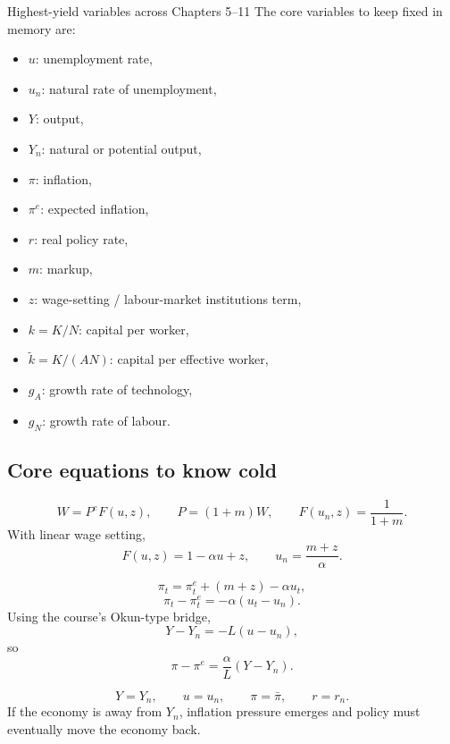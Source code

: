 \documentclass[12pt]{article}
\begin{document}
\begin{definition}{Highest-yield variables across Chapters 5--11}{}
The core variables to keep fixed in memory are:
\begin{itemize}[leftmargin=1.5em]
    \item $u$: unemployment rate,
    \item $u_n$: natural rate of unemployment,
    \item $Y$: output,
    \item $Y_n$: natural or potential output,
    \item $\pi$: inflation,
    \item $\pi^e$: expected inflation,
    \item $r$: real policy rate,
    \item $m$: markup,
    \item $z$: wage-setting / labour-market institutions term,
    \item $k=K/N$: capital per worker,
    \item $\tilde{k}=K/(AN)$: capital per effective worker,
    \item $g_A$: growth rate of technology,
    \item $g_N$: growth rate of labour.
\end{itemize}
\end{definition}

\subsection{Core equations to know cold}

\begin{keyformula}[title={Key Formula: Labour market and natural rate}]
\[
W=P^eF(u,z),
\qquad
P=(1+m)W,
\qquad
F(u_n,z)=\frac{1}{1+m}.
\]
With linear wage setting,
\[
F(u,z)=1-\alpha u+z,
\qquad
u_n=\frac{m+z}{\alpha}.
\]
\end{keyformula}

\begin{keyformula}[title={Key Formula: Phillips curve forms}]
\[
\pi_t=\pi_t^e+(m+z)-\alpha u_t,
\]
\[
\pi_t-\pi_t^e=-\alpha(u_t-u_n).
\]
Using the course's Okun-type bridge,
\[
Y-Y_n=-L(u-u_n),
\]
so
\[
\pi-\pi^e=\frac{\alpha}{L}(Y-Y_n).
\]
\end{keyformula}

\begin{keyformula}[title={Key Formula: Medium-run IS--LM--PC equilibrium}]
\[
Y=Y_n,\qquad u=u_n,\qquad \pi=\bar{\pi},\qquad r=r_n.
\]
If the economy is away from $Y_n$, inflation pressure emerges and policy must eventually move the economy back.
\end{keyformula}
\end{document}
